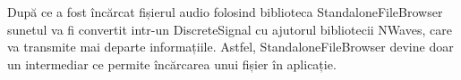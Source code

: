 	După ce a fost încărcat fișierul audio folosind biblioteca StandaloneFileBrowser sunetul va fi convertit intr-un DiscreteSignal cu ajutorul bibliotecii NWaves, care va transmite mai departe informațiile. Astfel, StandaloneFileBrowser devine doar un intermediar ce permite încărcarea unui fișier în aplicație.